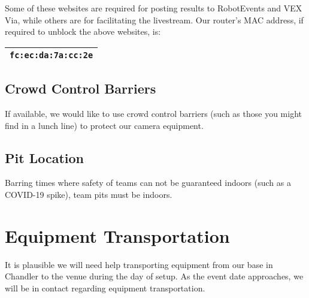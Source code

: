 \documentclass[12pt]{article}
\begin{document}
\noindent Some of these websites are required for posting results to RobotEvents and VEX Via, while others are for facilitating the livestream.
Our router's MAC address, if required to unblock the above websites, is:

\begin{centering}

    \begin{tabular}{|c|}
\hline
\texttt{fc:ec:da:7a:cc:2e} \\
\hline
\end{tabular}

\end{centering}

\subsection{Crowd Control Barriers}
If available, we would like to use crowd control barriers (such as those you might find in a lunch line) to protect our camera equipment.

\subsection{Pit Location}
Barring times where safety of teams can not be guaranteed indoors (such as a COVID-19 spike), team pits must be indoors.

\section{Equipment Transportation}
It is plausible we will need help transporting equipment from our base in Chandler to the venue during the day of setup.
As the event date approaches, we will be in contact regarding equipment transportation.
\end{document}
